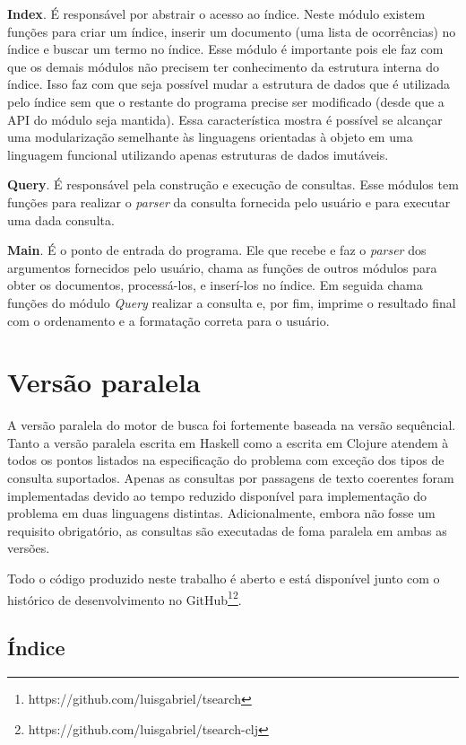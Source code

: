 \textbf{Index}. É responsável por abstrair o acesso ao índice. Neste módulo existem funções para criar um índice, inserir um documento (uma lista de ocorrências) no índice e buscar um termo no índice. Esse módulo é importante pois ele faz com que os demais módulos não precisem ter conhecimento da estrutura interna do índice. Isso faz com que seja possível mudar a estrutura de dados que é utilizada pelo índice sem que o restante do programa precise ser modificado (desde que a API do módulo seja mantida). Essa característica mostra é possível se alcançar uma modularização semelhante às linguagens orientadas à objeto em uma linguagem funcional utilizando apenas estruturas de dados imutáveis.

\textbf{Query}. É responsável pela construção e execução de consultas. Esse módulos tem funções para realizar o \emph{parser} da consulta fornecida pelo usuário e para executar uma dada consulta.

\textbf{Main}. É o ponto de entrada do programa. Ele que recebe e faz o \emph{parser} dos argumentos fornecidos pelo usuário, chama as funções de outros módulos para obter os documentos, processá-los, e inserí-los no índice. Em seguida chama funções do módulo \emph{Query} realizar a consulta e, por fim, imprime o resultado final com o ordenamento e a formatação correta para o usuário.


\section{Versão paralela}

A versão paralela do motor de busca foi fortemente baseada na versão sequêncial. Tanto a versão paralela escrita em Haskell como a escrita em Clojure atendem à todos os pontos listados na especificação do problema com exceção dos tipos de consulta suportados. Apenas as consultas por passagens de texto coerentes foram implementadas devido ao tempo reduzido disponível para implementação do problema em duas linguagens distintas. Adicionalmente, embora não fosse um requisito obrigatório, as consultas são executadas de foma paralela em ambas as versões.

Todo o código produzido neste trabalho é aberto e está disponível junto com o histórico de desenvolvimento no GitHub\footnote{https://github.com/luisgabriel/tsearch}\footnote{https://github.com/luisgabriel/tsearch-clj}.

\subsection{Índice}

